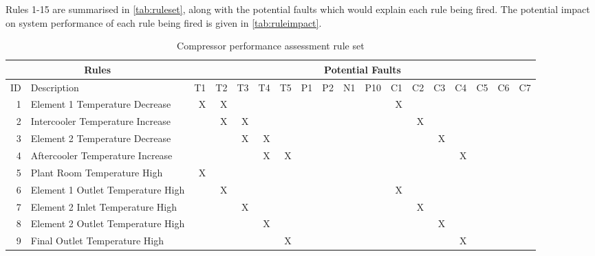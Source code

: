 Rules 1-15 are summarised in \autoref{tab:ruleset}, along with the potential faults which would explain each rule being fired. The potential impact on system performance of each rule being fired is given in \autoref{tab:ruleimpact}.

  
\begin{table}[htbp]
  \centering
  \scriptsize
  \caption{Compressor performance assessment rule set}
    \begin{tabular}{r|l|r|r|r|r|r|r|r|r|r|r|r|r|r|r|r|r}
    \toprule
    \multicolumn{2}{c}{Rules} & \multicolumn{16}{c}{Potential Faults} \\
    \midrule
    ID    & Description & T1    & T2    & T3    & T4    & T5    & P1    & P2    & N1    & P10   & C1    & C2    & C3    & C4    & C5    & C6    & C7 \\
    \midrule
    1     & Element 1 Temperature Decrease & X     & X     &       &       &       &       &       &       &       & X     &       &       &       &       &       &  \\
    2     & Intercooler Temperature Increase &       & X     & X     &       &       &       &       &       &       &       & X     &       &       &       &       &  \\
    3     & Element 2 Temperature Decrease &       &       & X     & X     &       &       &       &       &       &       &       & X     &       &       &       &  \\
    4     & Aftercooler Temperature Increase &       &       &       & X     & X     &       &       &       &       &       &       &       & X     &       &       &  \\
    5     & Plant Room Temperature High & X     &       &       &       &       &       &       &       &       &       &       &       &       &       &       &  \\
    6     & Element 1 Outlet Temperature High &       & X     &       &       &       &       &       &       &       & X     &       &       &       &       &       &  \\
    7     & Element 2 Inlet Temperature High &       &       & X     &       &       &       &       &       &       &       & X     &       &       &       &       &  \\
    8     & Element 2 Outlet Temperature High &       &       &       & X     &       &       &       &       &       &       &       & X     &       &       &       &  \\
    9     & Final Outlet Temperature High &       &       &       &       & X     &       &       &       &       &       &       &       & X     &       &       &  \\

\end{tabular}
\end{table}
